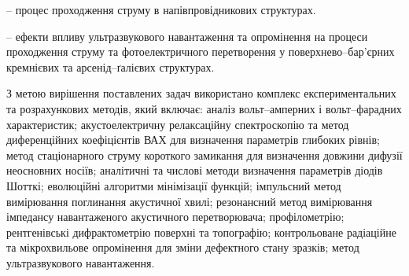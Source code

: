 {\ObjectTXT} --
процес проходження струму в напівпровідникових структурах.

{\PredmetTXT} --
ефекти впливу ультразвукового навантаження та опромінення на
процеси проходження струму та фотоелектричного перетворення у поверхнево--бар'єрних кремнієвих та арсенід--ґалієвих структурах.


{\MethodTXT}
З метою вирішення поставлених задач використано комплекс експериментальних та розрахункових методів, який включає:
аналіз вольт--амперних і
вольт--фарадних характеристик;
акустоелектричну релаксаційну спектроскопію та метод диференційних коефіцієнтів ВАХ для визначення параметрів глибоких рівнів;
метод стаціонарного струму короткого замикання для визначення довжини дифузії неосновних носіїв;
аналітичні та числові методи визначення параметрів діодів Шотткі;
еволюційні алгоритми мінімізації функцій;
імпульсний метод вимірювання поглинання акустичної хвилі;
резонансний метод вимірювання імпедансу навантаженого акустичного перетворювача;
профілометрію;
рентгенівські дифрактометрію поверхні та топографію;
контрольоване радіаційне та мікрохвильове опромінення для зміни дефектного стану зразків;
метод ультразвукового навантаження.



